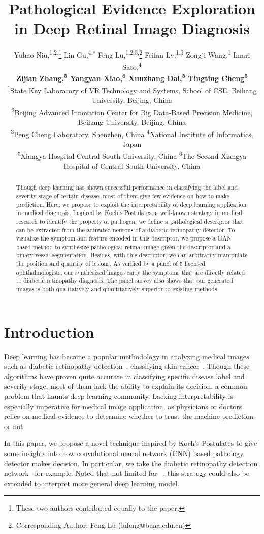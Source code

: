 \documentclass[letterpaper]{article} %
\title{Pathological Evidence Exploration in Deep Retinal Image Diagnosis}
\author{
Yuhao Niu,\textsuperscript{1,2,}\thanks{These two authors contributed equally to the paper.}
Lin Gu,\textsuperscript{4,}$^*$
Feng Lu,\textsuperscript{1,2,3,}\thanks{Corresponding Author: Feng Lu (lufeng@buaa.edu.cn)}
Feifan Lv,\textsuperscript{1,3}
Zongji Wang,\textsuperscript{1}
Imari Sato,\textsuperscript{4}\\{\bf \Large 
Zijian Zhang,\textsuperscript{5}
Yangyan Xiao,\textsuperscript{6}
Xunzhang Dai,\textsuperscript{5}
Tingting Cheng\textsuperscript{5}
} \\
\textsuperscript{1}State Key Laboratory of VR Technology and Systems, School of CSE, Beihang University, Beijing, China \\
\textsuperscript{2}Beijing Advanced Innovation Center for Big Data-Based Precision Medicine, Beihang University, Beijing, China\\
\textsuperscript{3}Peng Cheng Laboratory, Shenzhen, China \quad
\textsuperscript{4}National Institute of Informatics, Japan \\
\textsuperscript{5}Xiangya Hospital Central South University, China \quad
\textsuperscript{6}The Second Xiangya Hospital of Central South University, China
}
\begin{document}
	
	\maketitle
	\begin{abstract}
		Though deep learning has shown successful performance in classifying the label and severity stage of certain disease, most of them give few evidence on how to make prediction. Here, we propose to exploit the interpretability of deep learning application in medical diagnosis. Inspired by Koch's Postulates, a well-known strategy in medical research to identify the property of pathogen, we define a pathological descriptor that can be extracted from the activated neurons of a diabetic retinopathy detector. To visualize the symptom and feature encoded in this descriptor, we propose a GAN based method to synthesize pathological retinal image given the descriptor and a binary vessel segmentation. Besides, with this descriptor, we can arbitrarily manipulate the position and quantity of lesions. As verified by a panel of 5 licensed  ophthalmologists, our synthesized images carry the symptoms that are directly related to diabetic retinopathy diagnosis. The panel survey also shows that our generated images is both qualitatively and quantitatively superior to existing methods. 
	\end{abstract}
	
	\section{Introduction}
	
	Deep learning has become a popular methodology in analyzing medical images such as diabetic retinopathy detection~\cite{Gulshan2016jama}, classifying skin cancer~\cite{esteva2017nature}. Though these algorithms have proven quite accurate in classifying specific disease label and severity stage, most of them lack the ability to explain its decision, a common problem that haunts deep learning community. Lacking interpretability is especially imperative for medical image application, as physicians or doctors relies on medical evidence to determine whether to trust the machine prediction or not.
	
	In this paper, we propose a novel technique inspired by  Koch's Postulates to give some insights into how convolutional neural network (CNN) based pathology detector makes decision. In particular, we take the diabetic retinopathy detection network~\cite{oO2016detector} for example. Noted that not limited for ~\cite{oO2016detector}, this strategy could also be extended to interpret more general deep learning model.
    
\end{document}
